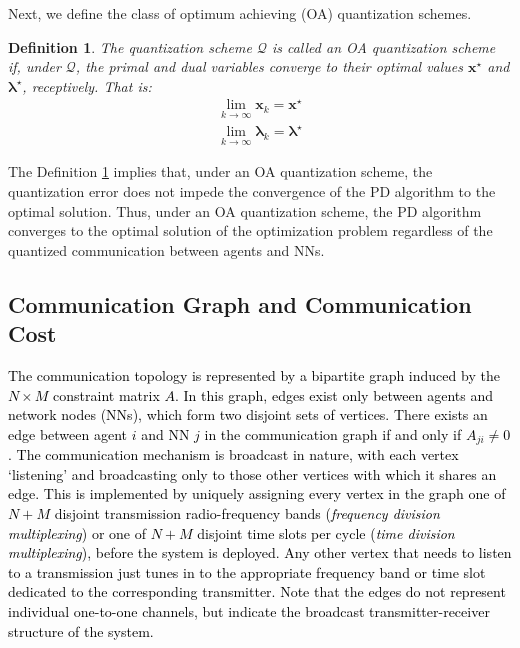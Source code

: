\documentclass[10pt,twocolumn,twoside]{IEEEtran}
\newtheorem{definition}{Definition}
\begin{document}
Next, we define the class of optimum achieving (OA) quantization schemes.
\begin{definition}\label{Def: OA}
The quantization scheme $\mathcal{Q}$ is called an OA quantization scheme if, under $\mathcal{Q}$, the primal and dual variables converge to their optimal values ${\ensuremath{\boldsymbol{{x}}}}^\star$ and ${\ensuremath{\boldsymbol{{\lambda}}}}^\star$, receptively. That is: 
\begin{eqnarray}
\lim_{k\rightarrow\infty}{\ensuremath{\boldsymbol{{x}}}}_k={\ensuremath{\boldsymbol{{x}}}}^\star\nonumber\\
\lim_{k\rightarrow\infty}{\ensuremath{\boldsymbol{{\lambda}}}}_k={\ensuremath{\boldsymbol{{\lambda}}}}^\star\nonumber
\end{eqnarray}
\end{definition}
The Definition \ref{Def: OA} implies that, under an OA quantization scheme, the quantization error does not impede the convergence of the  PD algorithm to the optimal solution. Thus, under an OA quantization scheme, the PD algorithm converges to the optimal solution of the optimization problem regardless of the quantized  communication between agents and NNs.

\subsection{Communication Graph and Communication Cost}

\textcolor{black}{The communication topology is represented  by a bipartite graph induced by the $N\times M$ constraint matrix $A$.  In this graph, edges exist only between agents and  network nodes (NNs), which  form two disjoint sets of vertices.
There exists an edge  between agent $i$ and NN $j$ 
  in the communication graph if and only if $A_{ji}\neq 0$. The communication mechanism is broadcast in nature,
with each vertex  `listening' and broadcasting only to those other vertices with which it shares an edge.
This is implemented by uniquely assigning every vertex in the graph   one of $N+M$ disjoint transmission radio-frequency bands ({\em frequency division multiplexing}) or one of $N+M$ disjoint time slots per cycle ({\em time division multiplexing}),
before the system is deployed. Any other vertex that needs to listen to a transmission just tunes in to the appropriate frequency band or time slot dedicated to the corresponding transmitter. 
Note that the edges do not represent individual one-to-one channels, but indicate the  broadcast transmitter-receiver structure of the system.}
\end{document}
